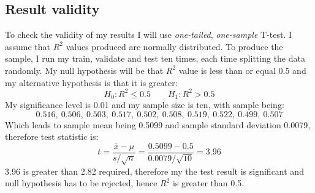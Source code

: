 \documentclass[12pt,a4paper]{book}
\begin{document}
\subsection{Result validity}
To check the validity of my results I will use \emph{one-tailed}, \emph{one-sample} T-test.
I assume that $R^2$ values produced are normally distributed.
To produce the sample, I run my train, validate and test ten times, each time splitting the data randomly.
My null hypothesis will be that $R^2$ value is less than or equal 0.5 and my alternative hypothesis is that it is greater:
\begin{equation*}
H_0: R^2 \leq 0.5 \qquad H_1: R^2 > 0.5
\end{equation*}
My significance level is 0.01 and my sample size is ten, with sample being:
\begin{equation*}
0.516,\ 0.506,\ 0.503,\ 0.517,\ 0.502,\ 0.508,\ 0.519,\ 0.522,\ 0.499,\ 0.507
\end{equation*}
Which leads to sample mean being 0.5099 and sample standard deviation 0.0079, therefore test statistic is:
\begin{equation*}
t = \frac{\bar{x}-\mu}{s/\sqrt{n}} = \frac{0.5099-0.5}{0.0079/\sqrt{10}} = 3.96
\end{equation*}
3.96 is greater than 2.82 required, therefore my the test result is significant and null hypothesis has to be rejected, hence $R^2$ is greater than 0.5.
\end{document}
